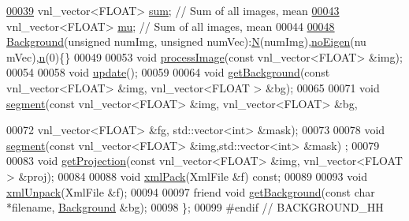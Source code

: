 \begin{DoxyCode}
\hypertarget{Background_8hh_source_l00039}{}\hyperlink{classBackground_acf1c2f84aee675205f2d93e5006b0cd8}{00039}                 vnl\_vector<FLOAT> \hyperlink{classBackground_acf1c2f84aee675205f2d93e5006b0cd8}{sum}; \textcolor{comment}{// Sum of all images, mean}
\hypertarget{Background_8hh_source_l00043}{}\hyperlink{classBackground_a23c1622d0f5af8a8a8cd90dd1898f3cb}{00043} \textcolor{comment}{}                vnl\_vector<FLOAT> \hyperlink{classBackground_a23c1622d0f5af8a8a8cd90dd1898f3cb}{mu}; \textcolor{comment}{// Sum of all images, mean}
00044 
\hypertarget{Background_8hh_source_l00048}{}\hyperlink{classBackground_a35fd9e4820fcc516dcb6f0aafd4b81a5}{00048}                 \hyperlink{classBackground_a35fd9e4820fcc516dcb6f0aafd4b81a5}{Background}(\textcolor{keywordtype}{unsigned} numImg, \textcolor{keywordtype}{unsigned} numVec):\hyperlink{classBackground_a8cc2e7240164328fdc3f0e5e21032c56}{N}(numImg),\hyperlink{classBackground_af6be8e29dfd74ef1409ead7fab675e32}{noEigen}(nu
      mVec),\hyperlink{classBackground_aeab71244afb687f16d8c4f5ee9d6ef0e}{n}(0)\{\}
00049 
00053                 \textcolor{keywordtype}{void} \hyperlink{classBackground_a525a161bc5029be7179fe7f73efc03f1}{processImage}(\textcolor{keyword}{const} vnl\_vector<FLOAT> &img);
00054 
00058                 \textcolor{keywordtype}{void} \hyperlink{classBackground_ac5c54df7ed3b930268c8d7752c101725}{update}();
00059 
00064                 \textcolor{keywordtype}{void} \hyperlink{classBackground_affc7eee3386eba2f0bfb53101fb32237}{getBackground}(\textcolor{keyword}{const} vnl\_vector<FLOAT> &img, vnl\_vector<FLOAT
      > &bg);
00065 
00071                 \textcolor{keywordtype}{void} \hyperlink{classBackground_aacb21ac01bd83b6e74b2550d6fa10c3a}{segment}(\textcolor{keyword}{const} vnl\_vector<FLOAT> &img, vnl\_vector<FLOAT> &bg,
      
00072                         vnl\_vector<FLOAT> &fg, std::vector<int> &mask);
00073 
00078                 \textcolor{keywordtype}{void} \hyperlink{classBackground_aacb21ac01bd83b6e74b2550d6fa10c3a}{segment}(\textcolor{keyword}{const} vnl\_vector<FLOAT> &img,std::vector<int> &mask)
      ;
00079 
00083                 \textcolor{keywordtype}{void} \hyperlink{classBackground_a58564ca6e89666e4508d4a12284ccc69}{getProjection}(\textcolor{keyword}{const} vnl\_vector<FLOAT> &img, vnl\_vector<FLOAT
      > &proj);
00084 
00088                 \textcolor{keywordtype}{void} \hyperlink{classBackground_ac5f640e4b28f43593586ce4b08f94585}{xmlPack}(XmlFile &f) \textcolor{keyword}{const};
00089 
00093                 \textcolor{keywordtype}{void} \hyperlink{classBackground_a24b0703d4eb9b6bdc1d87c8e67e000ea}{xmlUnpack}(XmlFile &f);
00094 
00097                 \textcolor{keyword}{friend} \textcolor{keywordtype}{void} \hyperlink{classBackground_affc7eee3386eba2f0bfb53101fb32237}{getBackground}(\textcolor{keyword}{const} \textcolor{keywordtype}{char} *filename, \hyperlink{classBackground}{Background} &bg);
00098 \};
00099 \textcolor{preprocessor}{#endif // BACKGROUND\_HH}
\end{DoxyCode}
